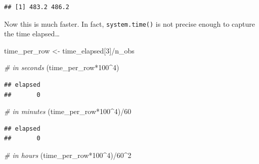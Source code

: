 \documentclass[
  12pt,
]{style/krantz}
\newenvironment{Shaded}{\begin{snugshade}}{\end{snugshade}}
\newcommand{\CommentTok}[1]{\textcolor[rgb]{0.56,0.35,0.01}{\textit{#1}}}
\newcommand{\DecValTok}[1]{\textcolor[rgb]{0.00,0.00,0.81}{#1}}
\newcommand{\FloatTok}[1]{\textcolor[rgb]{0.00,0.00,0.81}{#1}}
\newcommand{\FunctionTok}[1]{\textcolor[rgb]{0.00,0.00,0.00}{#1}}
\newcommand{\NormalTok}[1]{#1}
\newcommand{\OtherTok}[1]{\textcolor[rgb]{0.56,0.35,0.01}{#1}}
\newcommand{\SpecialCharTok}[1]{\textcolor[rgb]{0.00,0.00,0.00}{#1}}
\begin{document}
\begin{Shaded}
\end{Shaded}

\begin{verbatim}
## [1] 483.2 486.2
\end{verbatim}

Now this is much faster. In fact, \texttt{system.time()} is not precise enough to capture the time elapsed\ldots{}

\begin{Shaded}
\begin{Highlighting}[]
\NormalTok{time\_per\_row }\OtherTok{\textless{}{-}}\NormalTok{ time\_elapsed[}\DecValTok{3}\NormalTok{]}\SpecialCharTok{/}\NormalTok{n\_obs}

\CommentTok{\# in seconds}
\NormalTok{(time\_per\_row}\SpecialCharTok{*}\DecValTok{100}\SpecialCharTok{\^{}}\DecValTok{4}\NormalTok{) }
\end{Highlighting}
\end{Shaded}

\begin{verbatim}
## elapsed 
##       0
\end{verbatim}

\begin{Shaded}
\begin{Highlighting}[]
\CommentTok{\# in minutes}
\NormalTok{(time\_per\_row}\SpecialCharTok{*}\DecValTok{100}\SpecialCharTok{\^{}}\DecValTok{4}\NormalTok{)}\SpecialCharTok{/}\DecValTok{60} 
\end{Highlighting}
\end{Shaded}

\begin{verbatim}
## elapsed 
##       0
\end{verbatim}

\begin{Shaded}
\begin{Highlighting}[]
\CommentTok{\# in hours}
\NormalTok{(time\_per\_row}\SpecialCharTok{*}\DecValTok{100}\SpecialCharTok{\^{}}\DecValTok{4}\NormalTok{)}\SpecialCharTok{/}\DecValTok{60}\SpecialCharTok{\^{}}\DecValTok{2} 
\end{Highlighting}
\end{Shaded}
\end{document}
